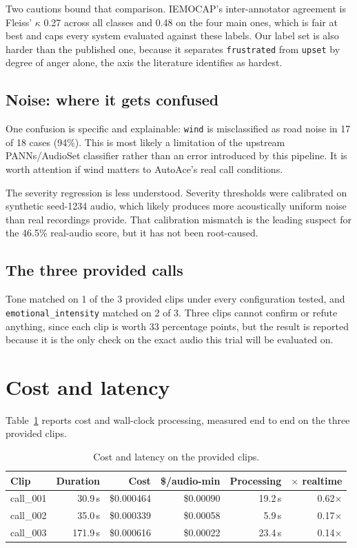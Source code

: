 \documentclass[11pt]{article}
\begin{document}
Two cautions bound that comparison. IEMOCAP's inter-annotator agreement is Fleiss' $\kappa$ 0.27 across all classes and 0.48 on the four main ones, which is fair at best and caps every system evaluated against these labels. Our label set is also harder than the published one, because it separates \texttt{frustrated} from \texttt{upset} by degree of anger alone, the axis the literature identifies as hardest.

\subsection{Noise: where it gets confused}

One confusion is specific and explainable: \texttt{wind} is misclassified as road noise in 17 of 18 cases (94\%). This is most likely a limitation of the upstream PANNs/AudioSet classifier rather than an error introduced by this pipeline. It is worth attention if wind matters to AutoAce's real call conditions.

The severity regression is less understood. Severity thresholds were calibrated on synthetic seed-1234 audio, which likely produces more acoustically uniform noise than real recordings provide. That calibration mismatch is the leading suspect for the 46.5\% real-audio score, but it has not been root-caused.

\subsection{The three provided calls}

Tone matched on 1 of the 3 provided clips under every configuration tested, and \texttt{emotional\_\allowbreak intensity} matched on 2 of 3. Three clips cannot confirm or refute anything, since each clip is worth 33 percentage points, but the result is reported because it is the only check on the exact audio this trial will be evaluated on.

\section{Cost and latency}

Table~\ref{tab:cost} reports cost and wall-clock processing, measured end to end on the three provided clips.

\begin{table}[htbp]
\centering
\caption{Cost and latency on the provided clips.}
\label{tab:cost}
\begin{tabular}{@{}l rrrrr@{}}
\toprule
\textbf{Clip} & \textbf{Duration} & \textbf{Cost} & \textbf{\$/audio-min} & \textbf{Processing} & \textbf{$\times$ realtime} \\
\midrule
call\_001 & 30.9\,s & \$0.000464 & \$0.00090 & 19.2\,s & 0.62$\times$ \\
call\_002 & 35.0\,s & \$0.000339 & \$0.00058 & 5.9\,s & 0.17$\times$ \\
call\_003 & 171.9\,s & \$0.000616 & \$0.00022 & 23.4\,s & 0.14$\times$ \\
\bottomrule
\end{tabular}
\end{table}
\end{document}
